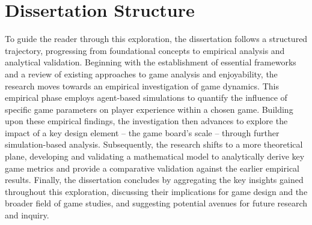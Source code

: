 \section{Dissertation Structure}
To guide the reader through this exploration, the dissertation follows a structured trajectory, progressing from foundational concepts to empirical analysis and analytical validation.  Beginning with the establishment of essential frameworks and a review of existing approaches to game analysis and enjoyability, the research moves towards an empirical investigation of game dynamics. This empirical phase employs agent-based simulations to quantify the influence of specific game parameters on player experience within a chosen game.  Building upon these empirical findings, the investigation then advances to explore the impact of a key design element – the game board's scale – through further simulation-based analysis.  Subsequently, the research shifts to a more theoretical plane, developing and validating a mathematical model to analytically derive key game metrics and provide a comparative validation against the earlier empirical results.  Finally, the dissertation concludes by aggregating the key insights gained throughout this exploration, discussing their implications for game design and the broader field of game studies, and suggesting potential avenues for future research and inquiry. 
